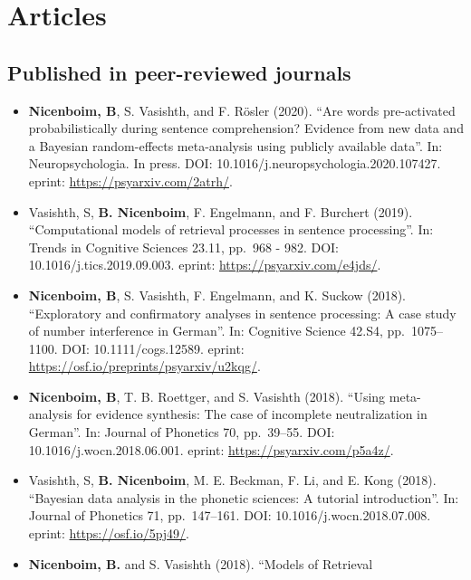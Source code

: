 \documentclass[]{article}
\begin{document}
\hypertarget{articles}{%
\section{Articles}\label{articles}}

\hypertarget{published-in-peer-reviewed-journals}{%
\subsection{\texorpdfstring{Published in peer-reviewed
journals}{Published  in peer-reviewed journals}}\label{published-in-peer-reviewed-journals}}

\begin{itemize}
\item
  \textbf{Nicenboim, B}, S. Vasishth, and F. Rösler (2020). ``Are words
  pre-activated probabilistically during sentence comprehension?
  Evidence from new data and a Bayesian random-effects meta-analysis
  using publicly available data''. In: Neuropsychologia. In press. DOI:
  10.1016/j.neuropsychologia.2020.107427. eprint:
  \url{https://psyarxiv.com/2atrh/}.
\item
  Vasishth, S, \textbf{B. Nicenboim}, F. Engelmann, and F. Burchert
  (2019). ``Computational models of retrieval processes in sentence
  processing''. In: Trends in Cognitive Sciences 23.11, pp.~968 - 982.
  DOI: 10.1016/j.tics.2019.09.003. eprint:
  \url{https://psyarxiv.com/e4jds/}.
\item
  \textbf{Nicenboim, B}, S. Vasishth, F. Engelmann, and K. Suckow
  (2018). ``Exploratory and confirmatory analyses in sentence
  processing: A case study of number interference in German''. In:
  Cognitive Science 42.S4, pp.~1075--1100. DOI: 10.1111/cogs.12589.
  eprint: \url{https://osf.io/preprints/psyarxiv/u2kqg/}.
\item
  \textbf{Nicenboim, B}, T. B. Roettger, and S. Vasishth (2018). ``Using
  meta-analysis for evidence synthesis: The case of incomplete
  neutralization in German''. In: Journal of Phonetics 70, pp.~39--55.
  DOI: 10.1016/j.wocn.2018.06.001. eprint:
  \url{https://psyarxiv.com/p5a4z/}.
\item
  Vasishth, S, \textbf{B. Nicenboim}, M. E. Beckman, F. Li, and E. Kong
  (2018). ``Bayesian data analysis in the phonetic sciences: A tutorial
  introduction''. In: Journal of Phonetics 71, pp.~147--161. DOI:
  10.1016/j.wocn.2018.07.008. eprint: \url{https://osf.io/5pj49/}.
\item
  \textbf{Nicenboim, B.} and S. Vasishth (2018). ``Models of Retrieval

\end{itemize}
\end{document}
